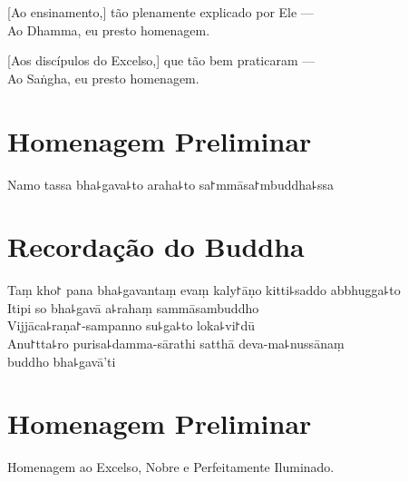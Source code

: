 [Ao ensinamento,] tão plenamente explicado por Ele ---\\
 Ao Dhamma, eu presto homenagem. 

[Aos discípulos do Excelso,] que tão bem praticaram ---\\
Ao Saṅgha, eu presto homenagem. 

\clearpage

\chapter*{Homenagem Preliminar}

\begin{leader}
\end{leader}

Namo tassa bha꜕gava꜕to araha꜕to sa꜓mmāsa꜓mbuddha꜕ssa


\chapter*{Recordação do Buddha}

\delegateSetUseNext

\begin{leader}
\end{leader}

Taṃ kho꜓ pana bha꜕gavantaṃ evaṃ kaly꜓āṇo kitti꜕saddo abbhugga꜕to\\
Itipi so bha꜕gavā a꜕rahaṃ sammāsambuddho\\
Vijjāca꜕raṇa꜓-sampanno su꜕ga꜕to loka꜕vi꜓dū\\
Anu꜓tta꜕ro purisa꜕damma-sārathi satthā deva-ma꜕nussānaṃ\\
\vin buddho bha꜕gavā'ti

\clearpage

\chapter{Homenagem Preliminar}

\begin{leader}
\end{leader}

Homenagem ao Excelso, Nobre e Perfeitamente Iluminado.


\nextChapterUseDelegatedPageNumber

